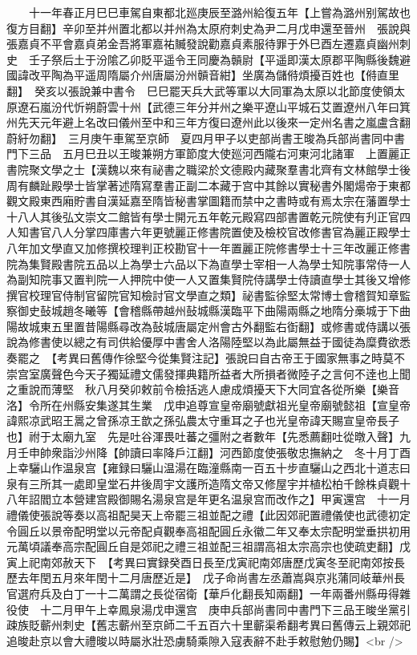 　　十一年春正月巳巳車駕自東都北廵庚辰至潞州給復五年【上嘗為潞州别駕故也復方目翻】辛卯至并州置北都以并州為太原府刺史為尹二月戊申還至晉州　張說與張嘉貞不平會嘉貞弟金吾將軍嘉祐贓發說勸嘉貞素服待罪于外巳酉左遷嘉貞幽州刺史　壬子祭后土于汾隂乙卯貶平遥令王同慶為贑尉【平遥即漢太原郡平陶縣後魏避國諱改平陶為平遥周隋屬介州唐屬汾州贑音紺】坐廣為儲偫煩擾百姓也【偫直里翻】　癸亥以張說兼中書令　巳巳罷天兵大武等軍以大同軍為太原以北節度使領太原遼石嵐汾代忻朔蔚雲十州【武德三年分并州之樂平遼山平城石艾置遼州八年曰箕州先天元年避上名改曰儀州至中和三年方復曰遼州此以後來一定州名書之嵐盧含翻蔚紆勿翻】　三月庚午車駕至京師　夏四月甲子以吏部尚書王晙為兵部尚書同中書門下三品　五月巳丑以王晙兼朔方軍節度大使廵河西隴右河東河北諸軍　上置麗正書院聚文學之士【漢魏以來有祕書之職梁於文德殿内藏聚羣書北齊有文林館學士後周有麟趾殿學士皆掌著述隋寫羣書正副二本藏于宫中其餘以實秘書外閣煬帝于東都觀文殿東西廂貯書自漢延嘉至隋皆秘書掌圖籍而禁中之書時或有焉太宗在藩置學士十八人其後弘文崇文二館皆有學士開元五年乾元殿寫四部書置乾元院使有刋正官四人知書官八人分掌四庫書六年更號麗正修書院置使及檢校官改修書官為麗正殿學士八年加文學直又加修撰校理判正校勘官十一年置麗正院修書學士十三年改麗正修書院為集賢殿書院五品以上為學士六品以下為直學士宰相一人為學士知院事常侍一人為副知院事又置判院一人押院中使一人又置集賢院侍講學士侍讀直學士其後又增修撰官校理官侍制官留院官知檢討官文學直之類】祕書監徐堅太常博士會稽賀知章監察御史鼔城趙冬曦等【會稽縣帶越州鼔城縣漢臨平下曲陽兩縣之地隋分槀城于下曲陽故城東五里置昔陽縣尋改為鼔城唐屬定州會古外翻監右衘翻】或修書或侍講以張說為修書使以總之有司供給優厚中書舍人洛陽陸堅以為此屬無益于國徒為糜費欲悉奏罷之　【考異曰舊傳作徐堅今從集賢注記】張說曰自古帝王于國家無事之時莫不崇宫室廣聲色今天子獨延禮文儒發揮典籍所益者大所損者微陸子之言何不逹也上聞之重說而薄堅　秋八月癸卯敕前令檢括逃人慮成煩擾天下大同宜各從所樂【樂音洛】令所在州縣安集遂其生業　戊申追尊宣皇帝廟號獻祖光皇帝廟號懿祖【宣皇帝諱熙凉武昭王暠之曾孫凉王歆之孫弘農太守重耳之子也光皇帝諱天賜宣皇帝長子也】祔于太廟九室　先是吐谷渾畏吐蕃之彊附之者數年【先悉薦翻吐從暾入聲】九月壬申帥衆詣沙州降【帥讀曰率降戶江翻】河西節度使張敬忠撫納之　冬十月丁酉上幸驪山作温泉宫【雍録曰驪山温湯在臨潼縣南一百五十步直驪山之西北十道志曰泉有三所其一處即皇堂石井後周宇文護所造隋文帝又修屋宇并植松柏千餘株貞觀十八年詔閻立本營建宫殿御賜名湯泉宫是年更名温泉宫而改作之】甲寅還宫　十一月禮儀使張說等奏以高祖配昊天上帝罷三祖並配之禮【此因郊祀置禮儀使也武德初定令圓丘以景帝配明堂以元帝配貞觀奉高祖配圓丘永徽二年又奉太宗配明堂垂拱初用元萬頃議奉高宗配圓丘自是郊祀之禮三祖並配三祖謂高祖太宗高宗也使疏吏翻】戊寅上祀南郊赦天下　【考異曰實録癸酉日長至戊寅祀南郊唐歷戊寅冬至祀南郊按長歷去年閏五月來年閏十二月唐歷近是】　戊子命尚書左丞蕭嵩與京兆蒲同岐華州長官選府兵及白丁一十二萬謂之長從宿衛【華戶化翻長知兩翻】一年兩番州縣毋得雜役使　十二月甲午上幸鳳泉湯戊申還宫　庚申兵部尚書同中書門下三品王晙坐黨引疎族貶蘄州刺史【舊志蘄州至京師二千五百六十里蘄渠希翻考異曰舊傳云上親郊祀追晙赴京以會大禮晙以時屬氷壯恐虜騎乘隙入寇表辭不赴手敕慰勉仍賜】<br />
